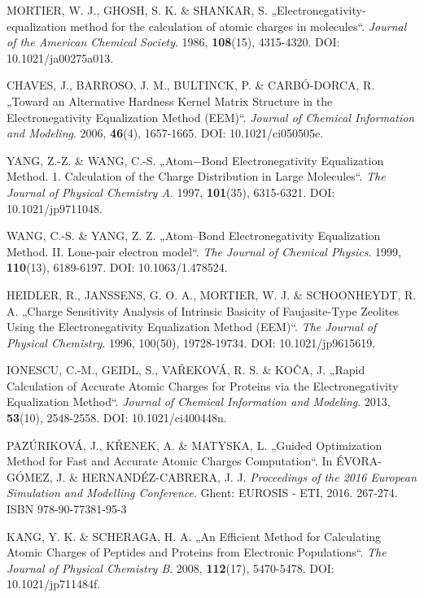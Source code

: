 \begin{thebibliography}{10}
MORTIER, W. J., GHOSH, S. K. \& SHANKAR, S. „Electronegativity-equalization method for the calculation of atomic charges in molecules“. \textit{Journal of the American Chemical Society}. 1986, \textbf{108}(15), 4315-4320. DOI: 10.1021/ja00275a013.

CHAVES, J., BARROSO, J. M., BULTINCK, P. \& CARBÓ-DORCA, R. „Toward an Alternative Hardness Kernel Matrix Structure in the Electronegativity Equalization Method (EEM)“. \textit{Journal of Chemical Information and Modeling}. 2006, \textbf{46}(4), 1657-1665. DOI: 10.1021/ci050505e.

YANG, Z.-Z. \& WANG, C.-S. „Atom−Bond Electronegativity Equalization Method. 1. Calculation of the Charge Distribution in Large Molecules“. \textit{The Journal of Physical Chemistry A}. 1997, \textbf{101}(35), 6315-6321. DOI: 10.1021/jp9711048. 

WANG, C.-S. \& YANG, Z. Z. „Atom–Bond Electronegativity Equalization Method. II. Lone-pair electron model“. \textit{The Journal of Chemical Physics}. 1999, \textbf{110}(13), 6189-6197. DOI: 10.1063/1.478524.

HEIDLER, R., JANSSENS, G. O. A., MORTIER, W. J. \& SCHOONHEYDT, R. A. „Charge Sensitivity Analysis of Intrinsic Basicity of Faujasite-Type Zeolites Using the Electronegativity Equalization Method (EEM)“. \textit{The Journal of Physical Chemistry}. 1996, 100(50), 19728-19734. DOI: 10.1021/jp9615619.

IONESCU, C.-M., GEIDL, S., VAŘEKOVÁ, R. S. \& KOČA, J. „Rapid Calculation of Accurate Atomic Charges for Proteins via the Electronegativity Equalization Method“. \textit{Journal of Chemical Information and Modeling}. 2013, \textbf{53}(10), 2548-2558. DOI: 10.1021/ci400448n.

PAZÚRIKOVÁ, J., KŘENEK, A. \& MATYSKA, L. „Guided Optimization Method for Fast and Accurate Atomic Charges Computation“. In ÉVORA-GÓMEZ, J. \& HERNANDÉZ-CABRERA, J. J. \textit{Proceedings of the 2016 European Simulation and Modelling Conference}. Ghent: EUROSIS - ETI, 2016. 267-274. ISBN 978-90-77381-95-3

KANG, Y. K. \& SCHERAGA, H. A. „An Efficient Method for Calculating Atomic Charges of Peptides and Proteins from Electronic Populations“. \textit{The Journal of Physical Chemistry B}. 2008, \textbf{112}(17), 5470-5478. DOI: 10.1021/jp711484f.


\end{thebibliography}
